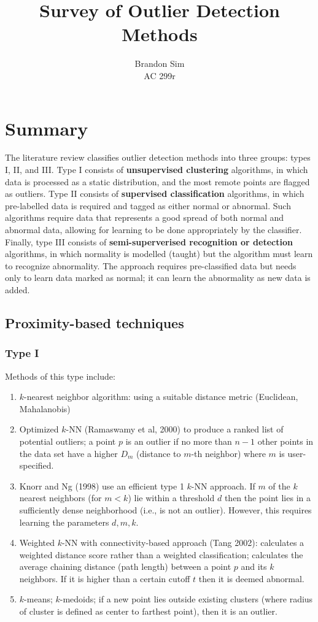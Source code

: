 \documentclass[11pt]{article}
\begin{document}
\title{Survey of Outlier Detection Methods}
\author{Brandon Sim\\AC 299r}
\date{}
\maketitle

\section{Summary}
The literature review classifies outlier detection methods into three groups: types I, II, and III. Type I consists of \textbf{unsupervised clustering} algorithms, in which data is processed as a static distribution, and the most remote points are flagged as outliers. Type II consists of \textbf{supervised classification} algorithms, in which pre-labelled data is required and tagged as either normal or abnormal. Such algorithms require data that represents a good spread of both normal and abnormal data, allowing for learning to be done appropriately by the classifier. Finally, type III consists of \textbf{semi-superverised recognition or detection} algorithms, in which normality is modelled (taught) but the algorithm must learn to recognize abnormality. The approach requires pre-classified data but needs only to learn data marked as normal; it can learn the abnormality as new data is added.

\subsection{Proximity-based techniques}
\subsubsection{Type I}
Methods of this type include:

\begin{enumerate}
\item $k$-nearest neighbor algorithm: using a suitable distance metric (Euclidean, Mahalanobis)
\item Optimized $k$-NN (Ramaswamy et al, 2000) to produce a ranked list of potential outliers; a point $p$ is an outlier if no more than $n-1$ other points in the data set have a higher $D_m$ (distance to $m$-th neighbor) where $m$ is user-specified.
\item Knorr and Ng (1998) use an efficient type 1 $k$-NN approach. If $m$ of the $k$ nearest neighbors (for $m<k$) lie within a threshold $d$ then the point lies in a sufficiently dense neighborhood (i.e., is not an outlier). However, this requires learning the parameters $d, m, k$.
\item Weighted $k$-NN with connectivity-based approach (Tang 2002): calculates a weighted distance score rather than a weighted classification; calculates the average chaining distance (path length) between a point $p$ and its $k$ neighbors. If it is higher than a certain cutoff $t$ then it is deemed abnormal.
\item $k$-means; $k$-medoids; if a new point lies outside existing clusters (where radius of cluster is defined as center to farthest point), then it is an outlier.
\end{enumerate}
\end{document}
